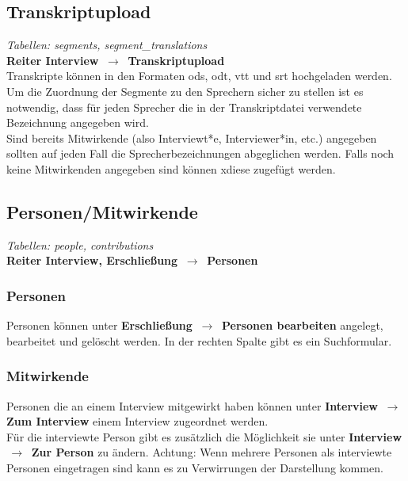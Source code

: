 \documentclass[a4paper,10pt]{article}
\begin{document}
\subsection{Transkriptupload}
\textit{Tabellen: segments, segment\_translations}\\

\textbf{Reiter Interview $\,\to $\, Transkriptupload}\\

Transkripte  können in den Formaten ods, odt, vtt und srt hochgeladen  werden.\\
Um die Zuordnung der Segmente zu den Sprechern sicher zu stellen ist es notwendig, dass für jeden Sprecher die in der Transkriptdatei verwendete Bezeichnung angegeben wird.\\
Sind bereits Mitwirkende (also Interviewt*e, Interviewer*in, etc.) angegeben sollten auf jeden Fall die  Sprecherbezeichnungen abgeglichen werden. Falls noch keine Mitwirkenden angegeben sind können xdiese zugefügt werden. 

\subsection{Personen\slash Mitwirkende}
\textit{Tabellen: people, contributions}\\
\textbf{Reiter Interview, Erschließung $\,\to $\, Personen}\\

\subsubsection{Personen}
Personen können unter \textbf{Erschließung $\,\to $\, Personen bearbeiten} angelegt, bearbeitet und gelöscht werden. In der rechten Spalte gibt es ein Suchformular.\\

\subsubsection{Mitwirkende}
Personen die an einem Interview mitgewirkt haben können unter \textbf{Interview $\,\to $\, Zum Interview} einem  Interview  zugeordnet werden. \\
Für die interviewte Person gibt es zusätzlich die Möglichkeit sie unter \textbf{Interview $\,\to $\, Zur Person} zu ändern. Achtung: Wenn mehrere Personen als interviewte Personen eingetragen sind  kann es zu Verwirrungen der Darstellung kommen.\\ 
\end{document}
